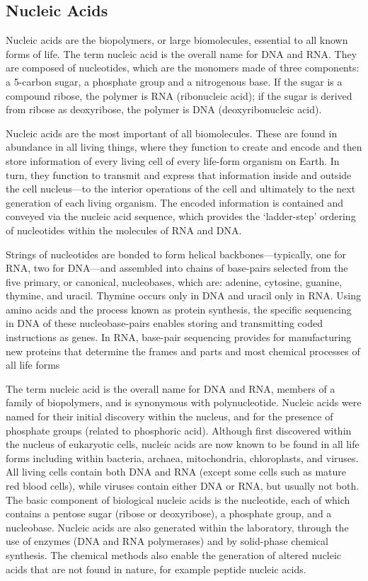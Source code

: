 \hypertarget{nucleic-acids}{%
\subsection{Nucleic Acids}\label{nucleic-acids}}

Nucleic acids are the biopolymers, or large biomolecules, essential to
all known forms of life. The term nucleic acid is the overall name for
DNA and RNA. They are composed of nucleotides, which are the monomers
made of three components: a 5-carbon sugar, a phosphate group and a
nitrogenous base. If the sugar is a compound ribose, the polymer is RNA
(ribonucleic acid); if the sugar is derived from ribose as deoxyribose,
the polymer is DNA (deoxyribonucleic acid).

Nucleic acids are the most important of all biomolecules. These are
found in abundance in all living things, where they function to create
and encode and then store information of every living cell of every
life-form organism on Earth. In turn, they function to transmit and
express that information inside and outside the cell nucleus---to the
interior operations of the cell and ultimately to the next generation of
each living organism. The encoded information is contained and conveyed
via the nucleic acid sequence, which provides the `ladder-step' ordering
of nucleotides within the molecules of RNA and DNA.

Strings of nucleotides are bonded to form helical backbones---typically,
one for RNA, two for DNA---and assembled into chains of base-pairs
selected from the five primary, or canonical, nucleobases, which are:
adenine, cytosine, guanine, thymine, and uracil. Thymine occurs only in
DNA and uracil only in RNA. Using amino acids and the process known as
protein synthesis, the specific sequencing in DNA of these
nucleobase-pairs enables storing and transmitting coded instructions as
genes. In RNA, base-pair sequencing provides for manufacturing new
proteins that determine the frames and parts and most chemical processes
of all life forms

The term nucleic acid is the overall name for DNA and RNA, members of a
family of biopolymers, and is synonymous with polynucleotide. Nucleic
acids were named for their initial discovery within the nucleus, and for
the presence of phosphate groups (related to phosphoric acid). Although
first discovered within the nucleus of eukaryotic cells, nucleic acids
are now known to be found in all life forms including within bacteria,
archaea, mitochondria, chloroplasts, and viruses. All living cells
contain both DNA and RNA (except some cells such as mature red blood
cells), while viruses contain either DNA or RNA, but usually not both.
The basic component of biological nucleic acids is the nucleotide, each
of which contains a pentose sugar (ribose or deoxyribose), a phosphate
group, and a nucleobase. Nucleic acids are also generated within the
laboratory, through the use of enzymes (DNA and RNA polymerases) and by
solid-phase chemical synthesis. The chemical methods also enable the
generation of altered nucleic acids that are not found in nature, for
example peptide nucleic acids.

